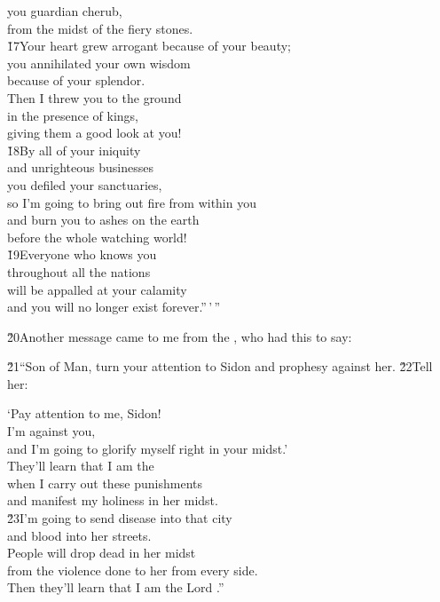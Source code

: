 \begin{poetry}
\poemll    you guardian cherub, \\
\poemlll       from the midst of the fiery stones. \\
\poeml \v{17}Your heart grew arrogant because of your beauty; \\
\poemll    you annihilated your own wisdom \\
\poemlll       because of your splendor. \\
\poeml Then I threw you to the ground \\
\poemll    in the presence of kings, \\
\poemlll       giving them a good look at you! \\
\poeml \v{18}By all of your iniquity \\
\poemll    and unrighteous businesses \\
\poeml you defiled your sanctuaries, \\
\poemll    so I'm going to bring out fire from within you \\
\poeml and burn you to ashes on the earth \\
\poemll    before the whole watching world! \\
\poeml \v{19}Everyone who knows you \\
\poemll    throughout all the nations \\
\poeml will be appalled at your calamity \\
\poemll    and you will no longer exist forever.''\,'\,''
\end{poetry}

\v{20}Another message came to me from the , who had this to say:

\v{21}``Son of Man, turn your attention to Sidon and prophesy against her. \v{22}Tell her:

\begin{poetry}
\poeml `Pay attention to me, Sidon! \\
\poemll    I'm against you, \\
\poemlll       and I'm going to glorify myself right in your midst.' \\
\poeml They'll learn that I am the  \\
\poemll    when I carry out these punishments \\
\poemlll       and manifest my holiness in her midst. \\
\poeml \v{23}I'm going to send disease into that city \\
\poemll    and blood into her streets. \\
\poeml People will drop dead in her midst \\
\poemll    from the violence done to her from every side. \\
\poemlll       Then they'll learn that I am the Lord .''
\end{poetry}

